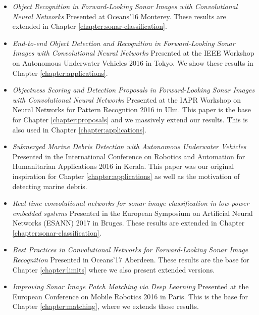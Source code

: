 \begin{itemize}
	\item \textit{Object Recognition in Forward-Looking Sonar Images with Convolutional Neural Networks}
	Presented at Oceans'16 Monterey. These results are extended in Chapter \ref{chapter:sonar-classification}.
	
	\item \textit{End-to-end Object Detection and Recognition in Forward-Looking Sonar Images with Convolutional Neural Networks} Presented at the IEEE Workshop on Autonomous Underwater Vehicles 2016 in Tokyo. We show these results in Chapter \ref{chapter:applications}.
	
	\item \textit{Objectness Scoring and Detection Proposals in Forward-Looking Sonar Images with Convolutional Neural Networks}
	Presented at the IAPR Workshop on Neural Networks for Pattern Recogntion 2016 in Ulm. This paper is the base for Chapter \ref{chapter:proposals} and we massively extend our results. This is also used in Chapter \ref{chapter:applications}.
	
	\item \textit{Submerged Marine Debris Detection with Autonomous Underwater Vehicles}
	Presented in the International Conference on Robotics and Automation for Humanitarian Applications 2016 in Kerala. This paper was our original inspiration for Chapter \ref{chapter:applications} as well as the motivation of detecting marine debris.
	
	\item \textit{Real-time convolutional networks for sonar image classification in 
	low-power embedded systems}
	Presented in the European Symposium on Artificial Neural Networks (ESANN) 2017 in Bruges. These results are extended in Chapter \ref{chapter:sonar-classification}.
	
	\item \textit{Best Practices in {C}onvolutional {N}etworks for {F}orward-{L}ooking {S}onar {I}mage {R}ecognition}
	Presented in Oceans'17 Aberdeen. These results are the base for Chapter \ref{chapter:limits} where we also present extended versions.
	
	\item \textit{{I}mproving {S}onar {I}mage {P}atch {M}atching via {D}eep {L}earning}
	Presented at the European Conference on Mobile Robotics 2016 in Paris. This is the base for Chapter \ref{chapter:matching}, where we extends those results.
\end{itemize}
